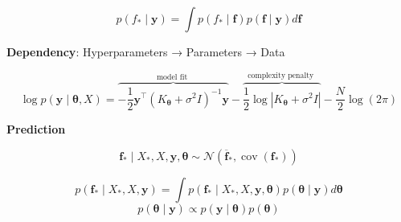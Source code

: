 \documentclass{article}
\begin{document}
\begin{equation}
    p\left(f_{*} \mid \boldsymbol{y}\right)=\int p\left(f_{*} \mid \boldsymbol{f}\right) p(\boldsymbol{f} \mid \boldsymbol{y}) d \boldsymbol{f}
\end{equation}

\textbf{Dependency}: Hyperparameters → Parameters → Data


\begin{equation}
    \log p(\boldsymbol{y} \mid \boldsymbol{\theta}, X)=\overbrace{-\frac{1}{2} \boldsymbol{y}^{\top}\left(K_{\boldsymbol{\theta}}+\sigma^{2} I\right)^{-1} \boldsymbol{y}}^{\text {model fit }}-\overbrace{\frac{1}{2} \log \left|K_{\boldsymbol{\theta}}+\sigma^{2} I\right|}^{\text {complexity penalty }}-\frac{N}{2} \log (2 \pi)
\end{equation}

\textbf{Prediction}

\begin{equation}
    \boldsymbol{f}_{*} \mid X_{*}, X, \boldsymbol{y}, \boldsymbol{\theta} \sim \mathcal{N}\left(\overline{\boldsymbol{f}}_{*}, \operatorname{cov}\left(\boldsymbol{f}_{*}\right)\right)
\end{equation}


\begin{equation}
    p\left(\boldsymbol{f}_{*} \mid X_{*}, X, \boldsymbol{y}\right)=\int p\left(\boldsymbol{f}_{*} \mid X_{*}, X, \boldsymbol{y}, \boldsymbol{\theta}\right) p(\boldsymbol{\theta} \mid \boldsymbol{y}) d \boldsymbol{\theta}
\end{equation}
\begin{equation}
    p(\boldsymbol{\theta} \mid \boldsymbol{y}) \propto p(\boldsymbol{y} \mid \boldsymbol{\theta}) p(\boldsymbol{\theta})
\end{equation}
\end{document}
